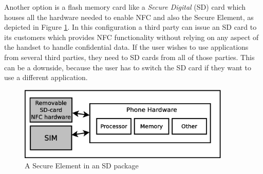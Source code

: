 \begin{enumerate}
\begin{item}
Another option is a flash memory card like a \textit{Secure Digital} (SD) card which houses all the hardware needed to enable NFC and also the Secure Element, as depicted in Figure \ref{fig:modular_se}.
In this configuration a third party can issue an SD card to its customers which provides NFC functionality without relying on any aspect of the handset to handle confidential data. If the user wishes to use applications from several third parties, they need to SD cards from all of those parties. This can be a downside, because the user has to switch the SD card if they want to use a different application.
\begin{figure}
\includegraphics[width=0.9\textwidth]{images/SD_NFC}
\caption[SE in SD package]
{
A Secure Element in an SD package
}
\label{fig:modular_se}
\end{figure}
\end{item}


\end{enumerate}
